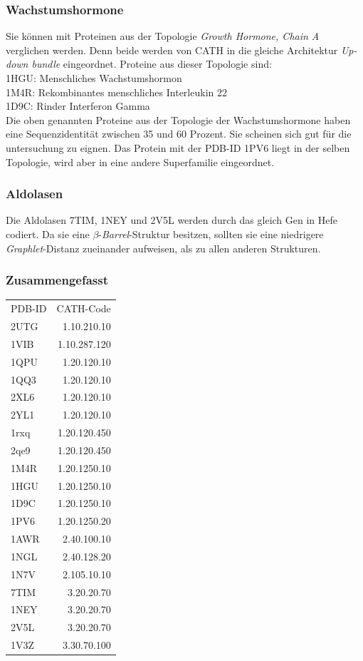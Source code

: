 \documentclass{report}
\begin{document}
\subsubsection{Wachstumshormone}

Sie k\"onnen mit Proteinen aus der Topologie \textit{Growth Hormone, Chain A} verglichen werden. Denn beide werden von CATH in die gleiche Architektur \emph{Up-down bundle} eingeordnet. Proteine aus dieser Topologie sind: \\
1HGU: Menschliches Wachstumshormon\\
1M4R: Rekombinantes menschliches Interleukin 22\\
1D9C: Rinder Interferon Gamma \\
Die oben genannten Proteine aus der Topologie der Wachstumshormone haben eine Sequenzidentit\"at zwischen 35 und 60 Prozent. Sie scheinen sich gut f\"ur die untersuchung zu eignen.
Das Protein mit der PDB-ID 1PV6 liegt in der selben Topologie, wird aber in eine andere Superfamilie eingeordnet.

\subsubsection{Aldolasen}

Die Aldolasen 7TIM, 1NEY und 2V5L werden durch das gleich Gen in Hefe codiert. Da sie eine $\beta$-\textit{Barrel}-Struktur besitzen, sollten sie eine niedrigere \textit{Graphlet}-Distanz zueinander aufweisen, als zu allen anderen Strukturen.

\subsubsection{Zusammengefasst}

\begin{tabular}{l r}

PDB-ID & CATH-Code  \\
2UTG & 1.10.210.10  \\
1VIB & 1.10.287.120 \\
1QPU & 1.20.120.10  \\
1QQ3 & 1.20.120.10  \\
2XL6 & 1.20.120.10  \\
2YL1 & 1.20.120.10  \\
1rxq & 1.20.120.450 \\
2qe9 & 1.20.120.450 \\
1M4R & 1.20.1250.10 \\
1HGU & 1.20.1250.10 \\
1D9C & 1.20.1250.10 \\
1PV6 & 1.20.1250.20 \\
1AWR & 2.40.100.10  \\
1NGL & 2.40.128.20  \\
1N7V & 2.105.10.10  \\ %
7TIM & 3.20.20.70   \\
1NEY & 3.20.20.70   \\
2V5L & 3.20.20.70   \\
1V3Z & 3.30.70.100  \\

\end{tabular}
\end{document}
